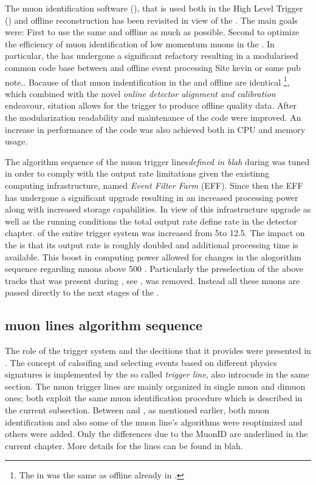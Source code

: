 
The muon identification software \cite{LHCb-PUB-2009-013,LHCb-PUB-2010-002} (\muonID),
that is used both in the High Level Trigger (\hlt) \cite{LHCb-PUB-2011-017} and offline reconstruction has been
revisited in view of the \lhc \runtwo. The main goals were: First to use the same \muonID and offline as much as
possible. Second to optimize the efficiency of muon identification of low momentum muons in the \hlt.
In particular, the \muonID has undergone a significant refactory resulting in a modularised common code base
between \hlt and offline event processing {\color{red} \cite{kevinThesis} Site kevin or some pub note.}. Bacause of that
muon indentification in the \hltone and offline are identical \footnote{The \muonID in \hlttwo was the same as offline already in \runone.},
which combined with the novel {\it online detector alignment and calibration} endeavour, {\color{red} sitation} allows for the trigger to produce offline quality data.
After the modularization readability and maintenance of the code were improved. An increase in performance
of the \muonID code was also achieved both in CPU and memory usage.

The algorithm sequence of the \hltone muon trigger lines{\it defined in blah} during \runone was tuned in order to
comply with the output rate limitations given the existinng computing infrastructure,
named {\it Event Filter Farm} (EFF). Since then the EFF has undergone a significant upgrade resulting in an
increased processing power along with increased storage capabilities. In view of this infrastructure upgrade
as well as the \runtwo \lhc running conditions the total output rate{\color{red} define rate in the detector chapter.} of the entire trigger system was increased
from 5\khz to 12.5\khz. The impact on the \hltone is that its output rate is roughly doubled and additional processing time is available.
This boost in computing power allowed for changes in the \muonID alogorithm sequence regarding muons above 500 \mevc.
Particularly the preselection of the above tracks that was present during \runone, see ,
was removed. Instead all these muons are passed directly to the next stages of the \muonID.

\subsection{\hltone muon lines algorithm sequence}
\label{hlt1run2}

The role of the trigger system and the decitions that it provides were presented in \secref{}.
The concept of calssifing and selecting events based on different physics signatures is implemented by
the so called {\it trigger line}, also introcude in the same section. The \hltone muon trigger lines are
mainly organized in single muon and dimuon ones; both exploit the same muon identification procedure which
is described in the current subsection. Between \runone and \runtwo, as mentioned earlier, both muon identification
and also some of the muon line's algorithms were reoptimized and others were added. Only the differences due
to the MuonID are underlined in the current chapter. { More details for the lines can be found in blah.}

